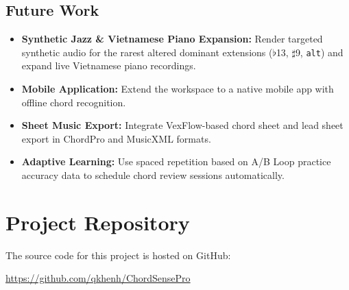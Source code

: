 \documentclass[a4paper]{article}
\begin{document}
\subsection*{Future Work}

\begin{itemize}
    \item \textbf{Synthetic Jazz \& Vietnamese Piano Expansion:} Render targeted synthetic audio for the rarest altered dominant extensions ($\flat$13, $\sharp$9, \texttt{alt}) and expand live Vietnamese piano recordings.
    \item \textbf{Mobile Application:} Extend the workspace to a native mobile app with offline chord recognition.
    \item \textbf{Sheet Music Export:} Integrate VexFlow-based chord sheet and lead sheet export in ChordPro and MusicXML formats.
    \item \textbf{Adaptive Learning:} Use spaced repetition based on A/B Loop practice accuracy data to schedule chord review sessions automatically.
\end{itemize}

\newpage
\nocite{*}
\printbibliography[title={References}, heading=bibintoc]

\section*{Project Repository}
The source code for this project is hosted on GitHub:

\begin{center}
    \url{https://github.com/qkhenh/ChordSensePro}
\end{center}
\end{document}
